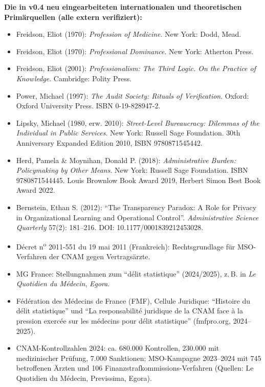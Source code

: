 \documentclass{umbruch-position}
\begin{document}
\textbf{Die in v0.4 neu eingearbeiteten internationalen und theoretischen Primärquellen (alle extern verifiziert):}

\begin{itemize}[nosep]
  \item Freidson, Eliot (1970): \textit{Profession of Medicine}. New York: Dodd, Mead.
  \item Freidson, Eliot (1970): \textit{Professional Dominance}. New York: Atherton Press.
  \item Freidson, Eliot (2001): \textit{Professionalism: The Third Logic. On the Practice of Knowledge}. Cambridge: Polity Press.
  \item Power, Michael (1997): \textit{The Audit Society: Rituals of Verification}. Oxford: Oxford University Press. ISBN 0-19-828947-2.
  \item Lipsky, Michael (1980, erw. 2010): \textit{Street-Level Bureaucracy: Dilemmas of the Individual in Public Services}. New York: Russell Sage Foundation. 30th Anniversary Expanded Edition 2010, ISBN 9780871545442.
  \item Herd, Pamela \& Moynihan, Donald P. (2018): \textit{Administrative Burden: Policymaking by Other Means}. New York: Russell Sage Foundation. ISBN 9780871544445. Louis Brownlow Book Award 2019, Herbert Simon Best Book Award 2022.
  \item Bernstein, Ethan S. (2012): ``The Transparency Paradox: A Role for Privacy in Organizational Learning and Operational Control''. \textit{Administrative Science Quarterly} 57(2): 181--216. DOI: 10.1177/0001839212453028.
  \item D\'ecret n\textsuperscript{o} 2011-551 du 19 mai 2011 (Frankreich): Rechtsgrundlage für MSO-Verfahren der CNAM gegen Vertragsärzte.
  \item MG France: Stellungnahmen zum ``d\'elit statistique'' (2024/2025), z.\,B. in \textit{Le Quotidien du M\'edecin}, \textit{Egora}.
  \item F\'ed\'eration des M\'edecins de France (FMF), Cellule Juridique: ``Histoire du d\'elit statistique'' und ``La responsabilit\'e juridique de la CNAM face \`a la pression exerc\'ee sur les m\'edecins pour d\'elit statistique'' (fmfpro.org, 2024--2025).
  \item CNAM-Kontrollzahlen 2024: ca. 680.000 Kontrollen, 230.000 mit medizinischer Prüfung, 7.000 Sanktionen; MSO-Kampagne 2023--2024 mit 745 betroffenen Ärzten und 106 Finanzstrafkommissions-Verfahren (Quellen: Le Quotidien du M\'edecin, Previssima, Egora).
\end{itemize}
\end{document}
